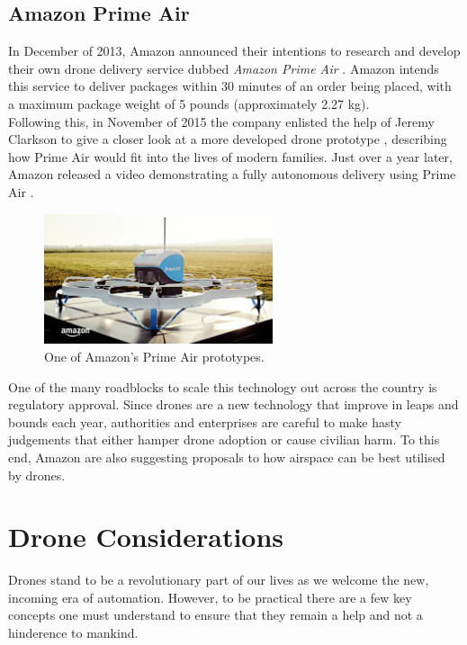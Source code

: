 \documentclass[a4paper,11pt,titlepage]{report}
\begin{document}
\subsection{Amazon Prime Air}
In December of 2013, Amazon announced their intentions to research and develop their own drone delivery service dubbed \textit{Amazon Prime Air} \cite{Amazon.comInc.2013}. Amazon intends this service to deliver packages within 30 minutes of an order being placed, with a maximum package weight of 5 pounds (approximately 2.27 kg).\\

Following this, in November of 2015 the company enlisted the help of Jeremy Clarkson to give a closer look at a more developed drone prototype \cite{Amazon.comInc.2015b}, describing how Prime Air would fit into the lives of modern families. Just over a year later, Amazon released a video demonstrating a fully autonomous delivery using Prime Air \cite{Amazon.comInc.2016}.

\begin{figure}[!hbpt]
  \centering
  \includegraphics[width=0.6\textwidth]{img/amazon_prime_air_drone.png}
  \caption{One of Amazon's Prime Air prototypes. \cite{Amazon.comInc.}}
  \label{fig:prime_air_example}
\end{figure}

One of the many roadblocks to scale this technology out across the country is regulatory approval. Since drones are a new technology that improve in leaps and bounds each year, authorities and enterprises are careful to make hasty judgements that either hamper drone adoption or cause civilian harm. To this end, Amazon are also suggesting proposals to how airspace can be best utilised by drones. \cite{Amazon.comInc.2015} \cite{Amazon.comInc.2015a}

\section{Drone Considerations}
Drones stand to be a revolutionary part of our lives as we welcome the new, incoming era of automation. However, to be practical there are a few key concepts one must understand to ensure that they remain a help and not a hinderence to mankind.
\end{document}
